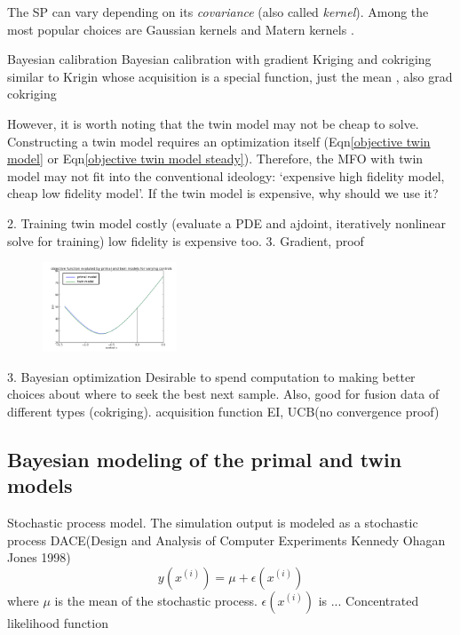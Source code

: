 \documentclass[a4paper,onecolumn]{article}
\theoremstyle{remark}
\begin{document}
The SP can vary depending
on its \emph{covariance} (also called \emph{kernel}).
Among the most popular choices are Gaussian kernels \cite{KennedyOhagan1}
and Matern kernels \cite{practicalBayesianopt}.


Bayesian calibration \cite{convergenceBayesian, KennedyOhagan1}
Bayesian calibration with gradient \cite{gradient kriging surrogate}
Kriging and cokriging \cite{kriging, cokriging}
similar to Krigin whose acquisition is a special function, just the mean
\cite{kriging functional surrogate}, also grad cokriging 
\cite{adjoint gradient cokriging without MLE}

 However, it is worth noting that the twin model
may not be cheap to solve. Constructing a twin model requires an optimization itself 
(Eqn\eqref{objective twin model} or Eqn\eqref{objective twin model steady}).
Therefore, the MFO with twin model may not fit into the conventional ideology:
`expensive high fidelity model, cheap low fidelity model'.
If the twin model is expensive, why should we use it?

2. Training twin model costly (evaluate a PDE and ajdoint, iteratively nonlinear solve for training)
   low fidelity is expensive too. 
3. Gradient, proof
   \begin{figure}[H]
       \includegraphics[width=4cm]{J_twin_vs_primal.png}
   \end{figure}
3. Bayesian optimization \cite{Mockus Bayesian opt, practicalBayesianopt}
   Desirable to spend computation to making better choices about where to seek the best next sample.
   Also, good for fusion data of different types (cokriging).
   acquisition function EI, UCB(no convergence proof)


\subsection{Bayesian modeling of the primal and twin models}
\label{bayesian_model}
Stochastic process model. The simulation output is modeled as a stochastic process
DACE(Design and Analysis of Computer Experiments Kennedy Ohagan Jones 1998)
$$
y(x^{(i)}) = \mu + \epsilon(x^{(i)})
$$
where $\mu$ is the mean of the stochastic process. $\epsilon(x^{(i)})$ is ...
Concentrated likelihood function
\end{document}
